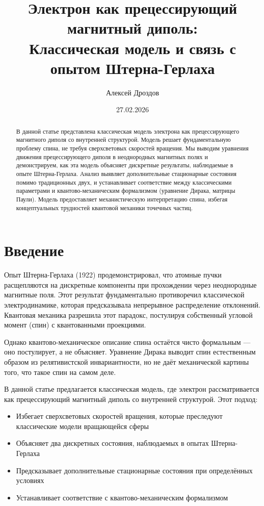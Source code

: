 \documentclass[12pt]{article}
\title{Электрон как прецессирующий магнитный диполь: \\ Классическая модель и связь с опытом Штерна-Герлаха}
\author{Алексей Дроздов}
\date{27.02.2026}
\begin{document}
\maketitle

\begin{abstract}
В данной статье представлена классическая модель электрона как прецессирующего магнитного диполя со внутренней структурой. Модель решает фундаментальную проблему спина, не требуя сверхсветовых скоростей вращения. Мы выводим уравнения движения прецессирующего диполя в неоднородных магнитных полях и демонстрируем, как эта модель объясняет дискретные результаты, наблюдаемые в опыте Штерна-Герлаха. Анализ выявляет дополнительные стационарные состояния помимо традиционных двух, и устанавливает соответствие между классическими параметрами и квантово-механическим формализмом (уравнение Дирака, матрицы Паули). Модель предоставляет механистическую интерпретацию спина, избегая концептуальных трудностей квантовой механики точечных частиц.
\end{abstract}

\section{Введение}

Опыт Штерна-Герлаха (1922) продемонстрировал, что атомные пучки расщепляются на дискретные компоненты при прохождении через неоднородные магнитные поля. Этот результат фундаментально противоречил классической электродинамике, которая предсказывала непрерывное распределение отклонений. Квантовая механика разрешила этот парадокс, постулируя собственный угловой момент (спин) с квантованными проекциями.

Однако квантово-механическое описание спина остаётся чисто формальным — оно постулирует, а не объясняет. Уравнение Дирака выводит спин естественным образом из релятивистской инвариантности, но не даёт механической картины того, что такое спин на самом деле.

В данной статье предлагается классическая модель, где электрон рассматривается как прецессирующий магнитный диполь со внутренней структурой. Этот подход:
\begin{itemize}
\item Избегает сверхсветовых скоростей вращения, которые преследуют классические модели вращающейся сферы
\item Объясняет два дискретных состояния, наблюдаемых в опытах Штерна-Герлаха
\item Предсказывает дополнительные стационарные состояния при определённых условиях
\item Устанавливает соответствие с квантово-механическим формализмом
\end{itemize}
\end{document}
